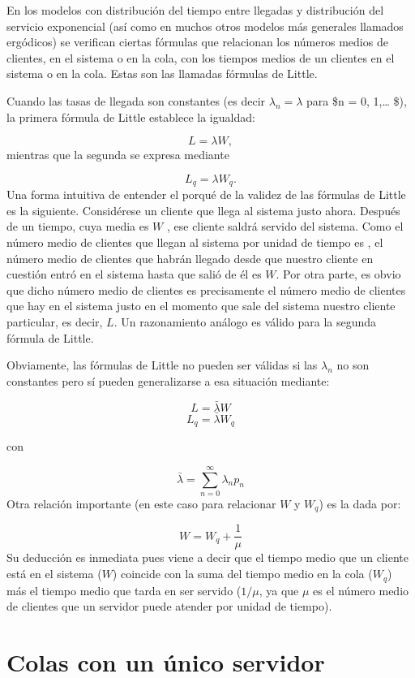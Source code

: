 \documentclass[
]{book}
\theoremstyle{definition}
\theoremstyle{definition}
\theoremstyle{definition}
\theoremstyle{definition}
\theoremstyle{remark}
\begin{document}
En los modelos con distribución del tiempo entre llegadas y distribución del servicio exponencial (así como en muchos otros modelos más generales llamados ergódicos) se verifican ciertas fórmulas que relacionan los números medios de clientes, en el sistema o en la cola, con los tiempos medios de un clientes en el sistema o en la cola. Estas son las llamadas fórmulas de Little.

Cuando las tasas de llegada son constantes (es decir \(\lambda_n = \lambda\) para \$n = 0, 1,\ldots{} \$), la primera fórmula de Little establece la igualdad:

\[L = \lambda W,\]
mientras que la segunda se expresa mediante

\[L_q = \lambda W_q.\]
Una forma intuitiva de entender el porqué de la validez de las fórmulas de Little es la siguiente. Considérese un cliente que llega al sistema justo ahora. Después de un tiempo, cuya media es \(W\) , ese cliente saldrá servido del sistema. Como el número medio de clientes que llegan al sistema por unidad de tiempo es , el número medio de clientes que habrán llegado desde que nuestro cliente en cuestión entró en el sistema hasta que salió de él es \(W\). Por otra parte, es obvio que dicho número medio de clientes es precisamente el número medio de clientes que hay en el sistema justo en el momento que sale del sistema nuestro cliente particular, es decir, \(L\). Un razonamiento análogo es válido para la segunda fórmula de Little.

Obviamente, las fórmulas de Little no pueden ser válidas si las \(\lambda_n\) no son constantes pero sí pueden generalizarse a esa situación mediante:

\[L = \bar{\lambda}W\]
\[L_q = \bar{\lambda}W_q\]

con

\[\bar{\lambda} = \sum_{n = 0}^{\infty} \lambda_np_n\]
Otra relación importante (en este caso para relacionar \(W\) y \(W_q\)) es la dada por:

\[W = W_q + \frac{1}{\mu}\]
Su deducción es inmediata pues viene a decir que el tiempo medio que un cliente está en el sistema (\(W\)) coincide con la suma del tiempo medio en la cola (\(W_q\)) más el tiempo medio que tarda en ser servido (\(1/\mu\), ya que \(\mu\) es el número medio de clientes que un servidor puede atender por unidad de tiempo).

\hypertarget{COLASC}{%
\section{Colas con un único servidor}\label{COLASC}}
\end{document}
